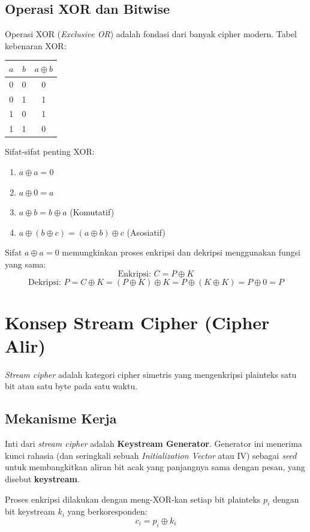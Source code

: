 \documentclass[../main.tex]{subfiles}
\begin{document}
\subsection{Operasi XOR dan Bitwise}
Operasi XOR (\textit{Exclusive OR}) adalah fondasi dari banyak cipher modern.
Tabel kebenaran XOR:
\begin{center}
\begin{tabular}{|c|c|c|}
\hline
$a$ & $b$ & $a \oplus b$ \\
\hline
0 & 0 & 0 \\
0 & 1 & 1 \\
1 & 0 & 1 \\
1 & 1 & 0 \\
\hline
\end{tabular}
\end{center}

Sifat-sifat penting XOR:
\begin{enumerate}
    \item $a \oplus a = 0$
    \item $a \oplus 0 = a$
    \item $a \oplus b = b \oplus a$ (Komutatif)
    \item $a \oplus (b \oplus c) = (a \oplus b) \oplus c$ (Asosiatif)
\end{enumerate}

Sifat $a \oplus a = 0$ memungkinkan proses enkripsi dan dekripsi menggunakan fungsi yang sama:
\[ \text{Enkripsi: } C = P \oplus K \]
\[ \text{Dekripsi: } P = C \oplus K = (P \oplus K) \oplus K = P \oplus (K \oplus K) = P \oplus 0 = P \]

\section{Konsep Stream Cipher (Cipher Alir)}
\textit{Stream cipher} adalah kategori cipher simetris yang mengenkripsi plainteks satu bit atau satu byte pada satu waktu.

\subsection{Mekanisme Kerja}
Inti dari \textit{stream cipher} adalah \textbf{Keystream Generator}. Generator ini menerima kunci rahasia (dan seringkali sebuah \textit{Initialization Vector} atau IV) sebagai \textit{seed} untuk membangkitkan aliran bit acak yang panjangnya sama dengan pesan, yang disebut \textbf{keystream}.

Proses enkripsi dilakukan dengan meng-XOR-kan setiap bit plainteks $p_i$ dengan bit keystream $k_i$ yang berkoresponden:
\[ c_i = p_i \oplus k_i \]
\end{document}
